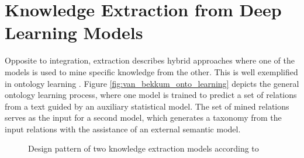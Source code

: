 



\section{Knowledge Extraction from Deep Learning Models} \label{sec:sota_knowledge_extraction_dl}
Opposite to integration, extraction describes hybrid approaches where one of the models is used to mine specific knowledge from the other. This is well exemplified in ontology learning \citep{Bouraoui_Jameel_Schockaert_2017,wong_ontology_2012,asim_ontology_2018}. Figure \ref{fig:van_bekkum_onto_learning} depicts the general ontology learning process, where one model is trained to predict a set of relations from a text guided by an auxiliary statistical model. The set of mined relations serves as the input for a second model, which generates a taxonomy from the input relations with the assistance of an external semantic model. 

\begin{figure}[t!]
    \centering
    \caption{Design pattern of two knowledge extraction models according to \cite{van_bekkum_modular_2021}}
    \label{fig:van_bekkum_explain_complete}
\end{figure}

